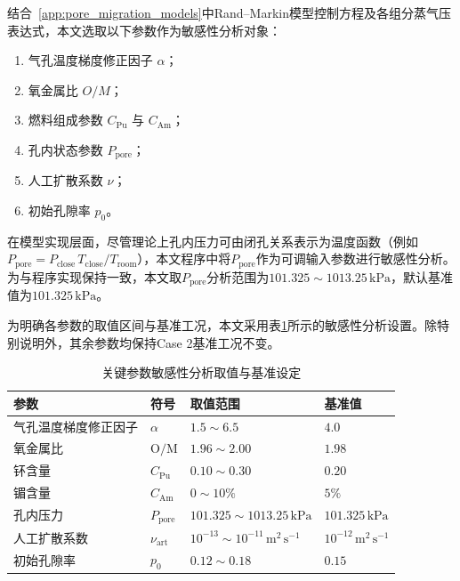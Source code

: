 结合~\ref{app:pore_migration_models}中Rand--Markin模型控制方程及各组分蒸气压表达式，本文选取以下参数作为敏感性分析对象：
\begin{enumerate}
	\item 气孔温度梯度修正因子 $\alpha$；
	\item 氧金属比 $O/M$；
	\item 燃料组成参数 $C_{\mathrm{Pu}}$ 与 $C_{\mathrm{Am}}$；
	\item 孔内状态参数 $P_{\mathrm{pore}}$；
	\item 人工扩散系数 $\nu$；
	\item 初始孔隙率 $p_0$。
\end{enumerate}

在模型实现层面，尽管理论上孔内压力可由闭孔关系表示为温度函数（例如 $P_{\mathrm{pore}}=P_{\mathrm{close}}\,T_{\mathrm{close}}/T_{\mathrm{room}}$），本文程序中将$P_{\mathrm{pore}}$作为可调输入参数进行敏感性分析。为与程序实现保持一致，本文取$P_{\mathrm{pore}}$分析范围为$101.325\sim1013.25\,\mathrm{kPa}$，默认基准值为$101.325\,\mathrm{kPa}$。

为明确各参数的取值区间与基准工况，本文采用表\ref{tab:sensitivity_parameters}所示的敏感性分析设置。除特别说明外，其余参数均保持Case 2基准工况不变。

\begin{table}[htbp]
	\centering
	\caption{关键参数敏感性分析取值与基准设定}
	\label{tab:sensitivity_parameters}
	\begin{tabularx}{\textwidth}{@{}
			>{\centering\arraybackslash}X
			>{\centering\arraybackslash}m{3.8cm}
			>{\centering\arraybackslash}m{3.8cm}
			>{\centering\arraybackslash}m{3cm}
			@{}}
		\toprule
		参数 & 符号 & 取值范围 & 基准值 \\
		\midrule
		气孔温度梯度修正因子 & $\alpha$ & $1.5\sim6.5$ & $4.0$ \\
		氧金属比 & $\mathrm{O/M}$ & $1.96\sim2.00$ & $1.98$ \\
		钚含量 & $C_{\mathrm{Pu}}$ & $0.10\sim0.30$ & $0.20$ \\
		镅含量 & $C_{\mathrm{Am}}$ & $0\sim10\%$ & $5\%$ \\
		孔内压力 & $P_{\mathrm{pore}}$ & $101.325\sim1013.25\,\mathrm{kPa}$ & $101.325\,\mathrm{kPa}$ \\
		人工扩散系数 & $\nu_{\mathrm{art}}$ & $10^{-13}\sim10^{-11}\,\mathrm{m^2\,s^{-1}}$ & $10^{-12}\,\mathrm{m^2\,s^{-1}}$ \\
		初始孔隙率 & $p_0$ & $0.12\sim0.18$ & $0.15$ \\
		\bottomrule
	\end{tabularx}
\end{table}

